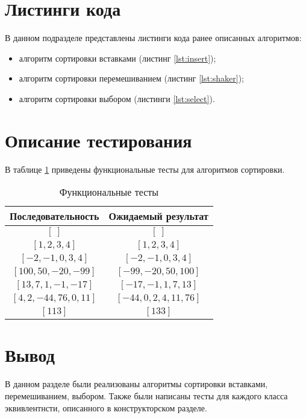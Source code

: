 \section{Листинги кода}

В данном подразделе представлены листинги кода ранее описанных алгоритмов:
\begin{itemize}[left=\parindent]
    \item алгоритм сортировки вставками (листинг \ref{lst:insert});
    \item алгоритм сортировки перемешиванием (листинг \ref{lst:shaker});
    \item алгоритм сортировки выбором (листинги \ref{lst:select}).
\end{itemize}


\section{Описание тестирования}

В таблице \ref{tab:tests} приведены функциональные тесты для алгоритмов
сортировки.

\begin{table}[h!]
	\begin{center}
    \begin{threeparttable}
        \captionsetup{justification=raggedright,singlelinecheck=off}
        \caption{\label{tab:tests}Функциональные тесты}
        \begin{tabular}{|c|c|}
			\hline
            \textbf{Последовательность} & \textbf{Ожидаемый результат} \\ [2mm]
            \hline
            $[~]$
            &
            $[~]$
            \\
            \hline
            $[1, 2, 3, 4]$
            &
            $[1, 2, 3, 4]$
            \\
            \hline
            $[-2, -1, 0, 3, 4]$
            &
            $[-2, -1, 0, 3, 4]$
            \\
            \hline
            $[100, 50, -20, -99]$
            &
            $[-99, -20, 50, 100]$
            \\
            \hline
            $[13, 7, 1, -1, -17]$
            &
            $[-17, -1, 1, 7, 13]$
            \\
            \hline
            $[4, 2, -44, 76, 0, 11]$
            &
            $[-44, 0, 2, 4, 11, 76]$
            \\
            \hline
            $[113]$
            &
            $[133]$
            \\
            \hline
		\end{tabular}
    \end{threeparttable} 
	\end{center}
\end{table}

\section{Вывод}

В данном разделе были реализованы алгоритмы сортировки вставками,
перемешиванием, выбором. Также были написаны тесты для каждого класса
эквивлентнсти, описанного в конструкторском разделе.
